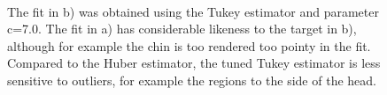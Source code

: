 \begin{figure}[h!]
\centering
{}\\
\caption{The fit in b) was obtained using the Tukey estimator and parameter c=7.0. The fit in a) has considerable likeness to the target in b), although for example the chin is too rendered too pointy in the fit. Compared to the Huber estimator, the tuned Tukey estimator is less sensitive to outliers, for example the regions to the side of the head.}
\label{fig:00029fit}
\end{figure}

